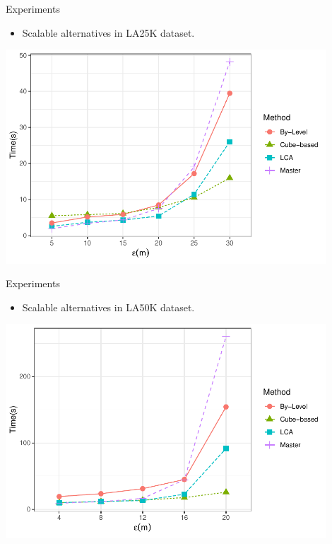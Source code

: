 \begin{frame}{Experiments}
    \begin{itemize}
        \item Scalable alternatives in LA25K dataset.
    \end{itemize} \vspace{0.25cm}

    \centering
    \includegraphics[width=0.9\textwidth]
            {../thesis/chapterPFlocks/figures/plots/08_sequential_parallel/la25k_e}
\end{frame}

\begin{frame}{Experiments}
    \begin{itemize}
        \item Scalable alternatives in LA50K dataset.
    \end{itemize} \vspace{0.25cm}

    \centering
    \includegraphics[width=0.9\textwidth]
            {../thesis/chapterPFlocks/figures/plots/08_sequential_parallel/la50k_e}
\end{frame}
